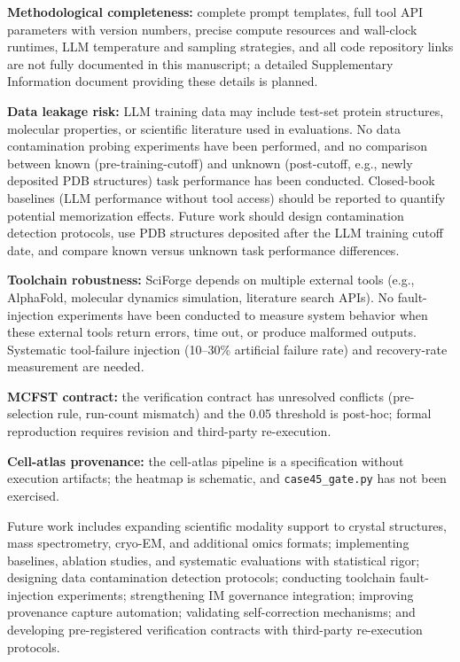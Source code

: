 \documentclass[sn-basic,Numbered,pdflatex]{sn-jnl}
\begin{document}
\textbf{Methodological completeness:} complete prompt templates, full tool API parameters with version numbers, precise compute resources and wall-clock runtimes, LLM temperature and sampling strategies, and all code repository links are not fully documented in this manuscript; a detailed Supplementary Information document providing these details is planned.

\textbf{Data leakage risk:} LLM training data may include test-set protein structures, molecular properties, or scientific literature used in evaluations. No data contamination probing experiments have been performed, and no comparison between known (pre-training-cutoff) and unknown (post-cutoff, e.g., newly deposited PDB structures) task performance has been conducted. Closed-book baselines (LLM performance without tool access) should be reported to quantify potential memorization effects. Future work should design contamination detection protocols, use PDB structures deposited after the LLM training cutoff date, and compare known versus unknown task performance differences.

\textbf{Toolchain robustness:} SciForge depends on multiple external tools (e.g., AlphaFold, molecular dynamics simulation, literature search APIs). No fault-injection experiments have been conducted to measure system behavior when these external tools return errors, time out, or produce malformed outputs. Systematic tool-failure injection (10--30\% artificial failure rate) and recovery-rate measurement are needed.

\textbf{MCFST contract:} the verification contract has unresolved conflicts (pre-selection rule, run-count mismatch) and the 0.05 threshold is post-hoc; formal reproduction requires revision and third-party re-execution.

\textbf{Cell-atlas provenance:} the cell-atlas pipeline is a specification without execution artifacts; the heatmap is schematic, and \texttt{case45\_gate.py} has not been exercised.

Future work includes expanding scientific modality support to crystal structures, mass spectrometry, cryo-EM, and additional omics formats; implementing baselines, ablation studies, and systematic evaluations with statistical rigor; designing data contamination detection protocols; conducting toolchain fault-injection experiments; strengthening IM governance integration; improving provenance capture automation; validating self-correction mechanisms; and developing pre-registered verification contracts with third-party re-execution protocols.
\end{document}
